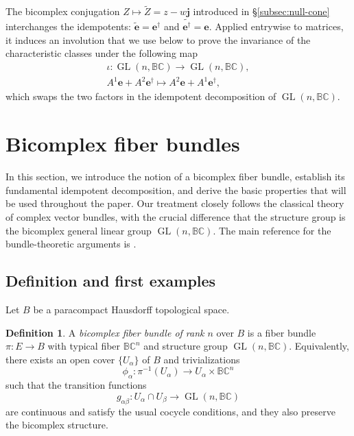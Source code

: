 \documentclass[11pt]{amsart}
\newcommand{\BC}{\mathbb{BC}}       %
\newcommand{\e}{\mathbf{e}}          %
\newcommand{\ed}{\mathbf{e}^\dagger} %
\newcommand{\GL}{\operatorname{GL}}  %
\theoremstyle{definition}
\newtheorem{defn}[prop]{Definition}       %
\begin{document}
The bicomplex conjugation $Z\mapsto\widetilde{Z}=z-w\mathbf{j}$ introduced in \S\textup{\ref{subsec:null-cone}} interchanges the idempotents: $\widetilde{\e}=\ed$ and $\widetilde{\ed}=\e$.
Applied entrywise to matrices, it induces an involution that we use below to prove the invariance of the characteristic classes under the following  map
\begin{equation}\label{eq:involutionmat}
\begin{gathered}
\iota: \GL(n,\BC)\to\GL(n,\BC),\\
A^1\e+A^2\ed \mapsto A^2\e+A^1\ed,
\end{gathered}   
\end{equation}
which swaps the two factors in the idempotent decomposition of $\GL(n,\BC)$.

\section{Bicomplex fiber bundles}\label{sec:bicomplex-fiber-bundles}

In this section, we introduce the notion of a bicomplex fiber bundle, establish its fundamental idempotent decomposition, and derive the basic properties that will be used throughout the paper. Our treatment closely follows the classical theory of complex vector bundles, with the crucial difference that the structure group is the bicomplex general linear group $\GL(n,\BC)$. The main reference for the bundle-theoretic arguments is \cite[Chapter~1]{Ati1967}.

\subsection{Definition and first examples}

Let $B$ be a paracompact Hausdorff topological space.

\begin{defn}
    A \emph{bicomplex fiber bundle of rank $n$} over $B$ is a fiber bundle $\pi:E \to B$ with typical fiber $\BC^n$ and structure group $\GL(n,\BC)$. Equivalently, there exists an open cover $\{U_\alpha\}$ of $B$ and trivializations
    \begin{equation*}
        \phi_\alpha : \pi^{-1}(U_\alpha) \to U_\alpha \times \BC^n
    \end{equation*}
    such that the transition functions
    \begin{equation*}
        g_{\alpha\beta} : U_\alpha \cap U_\beta \to \GL(n,\BC)
    \end{equation*}
    are continuous and satisfy the usual cocycle conditions, and they also preserve the bicomplex structure.
\end{defn}
\end{document}
